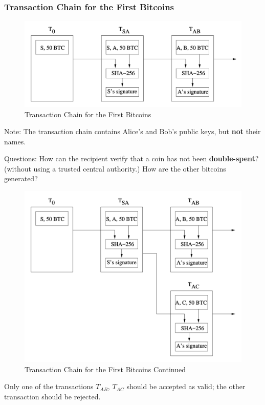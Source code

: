 \documentclass[12pt,titlepage]{article}
\begin{document}
\subsubsection{Transaction Chain for the First Bitcoins}
\begin{center}
	\begin{figure}[h!]
		\centering
		\includegraphics[width=\textwidth]{Transaction_Chain_for_the_First_Bitcoins.png}
		\caption{Transaction Chain for the First Bitcoins}
	\end{figure}
\end{center}
Note: The transaction chain contains Alice’s and Bob’s public keys, but \textbf{not} their names.

Questions: How can the recipient verify that a coin has not been \textbf{double-spent}? (without using a trusted central authority.) How are the other bitcoins generated?
\newpage
\begin{center}
	\begin{figure}[h!]
		\centering
		\includegraphics[width=\textwidth]{Transaction_Chain_for_the_First_Bitcoins_2.png}
		\caption{Transaction Chain for the First Bitcoins Continued}
	\end{figure}
\end{center}
Only one of the transactions $T_{AB}$, $T_{AC}$ should be accepted as valid; the other transaction should be rejected.
\end{document}
